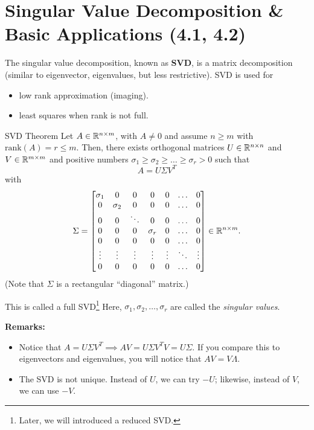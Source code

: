 \documentclass[letterpaper]{article}
\newcommand{\0}{\mathbf{0}}
\begin{document}
\section{Singular Value Decomposition \& Basic Applications (4.1, 4.2)}
The singular value decomposition, known as \textbf{SVD}, is a matrix decomposition (similar to eigenvector, eigenvalues, but less restrictive). SVD is used for 
\begin{itemize}
    \item low rank approximation (imaging).
    \item least squares when rank is not full. 
\end{itemize}

\begin{theorem}{SVD Theorem}{}
    Let $A \in \mathbb{R}^{n \times m}$, with $A \neq 0$ and assume $n \geq m$ with $\text{rank}(A) = r \leq m$. Then, there exists orthogonal matrices $U \in \mathbb{R}^{n \times n}$ and $V \in \mathbb{R}^{m \times m}$ and positive numbers $\sigma_1 \geq \sigma_2 \geq \hdots \geq \sigma_r > 0$ such that \[A = U \Sigma V^T\] with \[\Sigma = \begin{bmatrix}
        \sigma_1 & 0 & 0 & 0 & 0 & \hdots & 0 \\ 
        0 & \sigma_2 & 0 & 0 & 0 & \hdots & 0 \\ 
        0 & 0 & \ddots & 0 & 0 & \hdots & 0 \\ 
        0 & 0 & 0 & \sigma_r & 0 & \hdots & 0 \\ 
        0 & 0 & 0 & 0 & 0 & \hdots & 0 \\ 
        \vdots & \vdots & \vdots & \vdots & \vdots & \ddots & \vdots \\ 
        0 & 0 & 0 & 0 & 0 & \hdots & 0
    \end{bmatrix} \in \mathbb{R}^{n \times m}.\]
    (Note that $\Sigma$ is a rectangular ``diagonal'' matrix.)
\end{theorem}
This is called a full SVD\footnote{Later, we will introduced a reduced SVD.} Here, $\sigma_1, \sigma_2, \hdots, \sigma_r$ are called the \emph{singular values}.

\textbf{Remarks:}
\begin{itemize}
    \item Notice that $A = U\Sigma V^T \implies AV = U\Sigma V^T V = U\Sigma$. If you compare this to eigenvectors and eigenvalues, you will notice that $AV = V\Lambda$. 
    
    \item The SVD is not unique. Instead of $U$, we can try $-U$; likewise, instead of $V$, we can use $-V$. 
\end{itemize}
\end{document}
